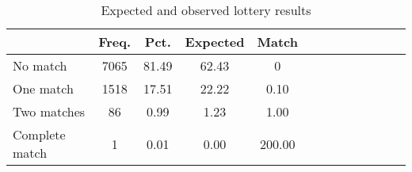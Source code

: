 \begin{table}[htbp]\centering
\def\sym#1{\ifmmode^{#1}\else\(^{#1}\)\fi}
\caption{Expected and observed lottery results}
\begin{tabular}{l*{4}{ccc}}
\toprule
                    &        Freq.&         Pct.&      Expected& Match\\
\midrule
No match                   &        7065&       81.49&       62.43& 0\\
One match                   &        1518&       17.51&       22.22& 0.10\\
Two matches                   &          86&        0.99&       1.23& 1.00\\
Complete match                   &           1&        0.01&      0.00& 200.00\\
\bottomrule
\end{tabular}
\end{table}
